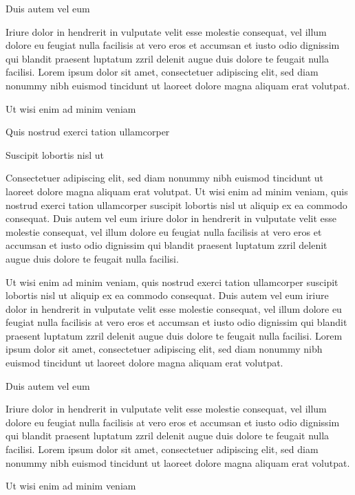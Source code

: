 \documentclass[11pt,twoside]{article}\makeatletter
\begin{document}
Duis autem vel eum \par
Iriure dolor in hendrerit in vulputate velit esse molestie       consequat, vel illum dolore eu feugiat nulla facilisis at vero eros et       accumsan et iusto odio dignissim qui blandit praesent luptatum zzril       delenit augue duis dolore te feugait nulla facilisi. Lorem ipsum dolor       sit amet, consectetuer adipiscing elit, sed diam nonummy nibh euismod       tincidunt ut laoreet dolore magna aliquam erat volutpat. \par
Ut wisi enim ad minim veniam\par
Quis nostrud exerci tation ullamcorper \par
Suscipit lobortis nisl ut \par
Consectetuer adipiscing elit, sed diam nonummy nibh euismod       tincidunt ut laoreet dolore magna aliquam erat volutpat. Ut wisi enim       ad minim veniam, quis nostrud exerci tation ullamcorper suscipit       lobortis nisl ut aliquip ex ea commodo consequat. Duis autem vel eum       iriure dolor in hendrerit in vulputate velit esse molestie consequat,       vel illum dolore eu feugiat nulla facilisis at vero eros et accumsan       et iusto odio dignissim qui blandit praesent luptatum zzril delenit       augue duis dolore te feugait nulla facilisi.\par
Ut wisi enim ad minim veniam, quis nostrud exerci tation       ullamcorper suscipit lobortis nisl ut aliquip ex ea commodo       consequat. Duis autem vel eum iriure dolor in hendrerit in vulputate       velit esse molestie consequat, vel illum dolore eu feugiat nulla       facilisis at vero eros et accumsan et iusto odio dignissim qui blandit       praesent luptatum zzril delenit augue duis dolore te feugait nulla       facilisi. Lorem ipsum dolor sit amet, consectetuer adipiscing elit,       sed diam nonummy nibh euismod tincidunt ut laoreet dolore magna       aliquam erat volutpat. \par
Duis autem vel eum \par
Iriure dolor in hendrerit in vulputate velit esse molestie       consequat, vel illum dolore eu feugiat nulla facilisis at vero eros et       accumsan et iusto odio dignissim qui blandit praesent luptatum zzril       delenit augue duis dolore te feugait nulla facilisi. Lorem ipsum dolor       sit amet, consectetuer adipiscing elit, sed diam nonummy nibh euismod       tincidunt ut laoreet dolore magna aliquam erat volutpat. \par
Ut wisi enim ad minim veniam\par
\end{document}
